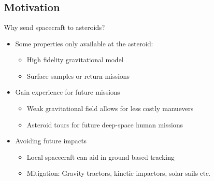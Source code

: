 
\section*{}
\subsection*{Motivation}  


\begin{frame}[t]{Why send spacecraft to asteroids?}
    \begin{itemize}
        \item Some properties only available at the asteroid:
            \begin{itemize}
                \item High fidelity gravitational model
                \item Surface samples or return missions
            \end{itemize}
        \item Gain experience for future missions
            \begin{itemize}
                \item Weak gravitational field allows for less costly manuevers
                \item Asteroid tours for future deep-space human missions
            \end{itemize}
        \item Avoiding future impacts
            \begin{itemize}
                \item Local spacecraft can aid in ground based tracking
                \item Mitigation: Gravity tractors, kinetic impactors, solar sails etc.
            \end{itemize}
    \end{itemize}

\end{frame}


